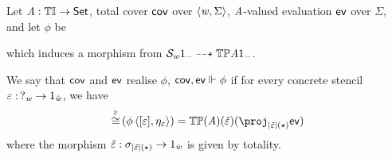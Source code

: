 Let $\mathit{A} : {\mathbb{T}\mathbb{I}} \to \mathsf{Set}$, total cover $\mathsf{cov}$ over $\langle\mathit{w}, \Sigma\rangle$, $\mathit{A}$-valued evaluation $\mathsf{ev}$ over $\Sigma$, 
and let $\phi$ be
\begin{center}
\end{center}
which induces a morphism from $\mathcal{S}_{\mathit{w}}1_{-} \dashrightarrow {\mathbb{T}{\mathbb{P}}}\mathit{A}1_{-}$.

\begin{definition}[Realisation]
We say that $\mathsf{cov}$ and $\mathsf{ev}$ realise $\phi$, $\mathsf{cov},\mathsf{ev} \Vdash \phi$ if
for every concrete stencil $\varepsilon :\, ?_{\mathit{w}} \to 1_{\hat{\mathit{w}}}$, we have
\[ \hmonIso(\phi\,\pair{\anyL\me}{\mvarM_\me}) = \thideMon(\vA)(\tilde\me)(\proj_{\indF{\tilde\me}(\star)} \ev) \]  
where the morphism $\tilde{\varepsilon} : \sigma_{|{\tilde{\varepsilon}}|(\star)} \to 1_{\hat{\mathit{w}}}$ is given by totality.
\end{definition}

